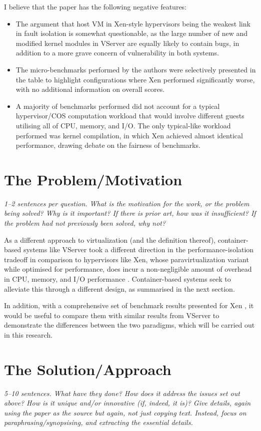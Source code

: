 \documentclass[11pt]{article}
\begin{document}
I believe that the paper has the following negative features:
\begin{itemize}
	\item The argument that host VM in Xen-style hypervisors being the weakest link in fault isolation is somewhat questionable, as the large number of new and modified kernel modules in VServer are equally likely to contain bugs, in addition to a more grave concern of vulnerability in both systems.
	\item The micro-benchmarks performed by the authors were selectively presented in the table to highlight configurations where Xen performed significantly worse, with no additional information on overall scores.
	\item A majority of benchmarks performed did not account for a typical hypervisor/COS computation workload that would involve different guests utilising all of CPU, memory, and I/O. The only typical-like workload performed was kernel compilation, in which Xen achieved almost identical performance, drawing debate on the fairness of benchmarks.
\end{itemize}

\section*{The Problem/Motivation}
\textsl{1--2 sentences per question. What is the motivation for the work, or the problem being solved? Why is it important? If there is prior art, how was it insufficient? If the problem had not previously been solved, why not?}

As a different approach to virtualization (and the definition thereof), container-based systems like VServer took a different direction in the performance-isolation tradeoff in comparison to hypervisors like Xen, whose paravirtualization variant while optimised for performance, does incur a non-negligible amount of overhead in CPU, memory, and I/O performance \cite[Sec. 4]{barham2003xen}. Container-based systems seek to alleviate this through a different design, as summarised in the next section.

In addition, with a comprehensive set of benchmark results presented for Xen \cite[Sec. 4]{barham2003xen}, it would be useful to compare them with similar results from VServer to demonstrate the differences between the two paradigms, which will be carried out in this research.

\section*{The Solution/Approach}
\textsl{5--10 sentences. What have they done? How does it address the issues set out above? How is it unique and/or innovative (if, indeed, it is)? Give details, again using the paper as the source but again, not just copying text. Instead, focus on paraphrasing/synopsising, and extracting the essential details.}
\end{document}
